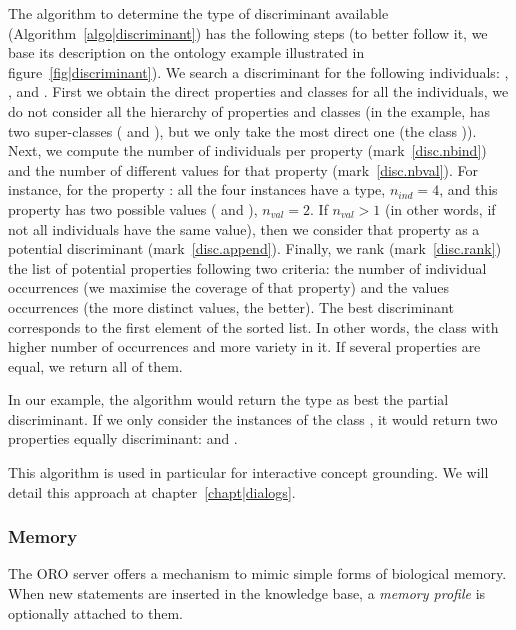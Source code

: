 The algorithm to determine the type of discriminant available
(Algorithm~\ref{algo|discriminant}) has the following steps (to better follow
it, we base its description on the ontology example illustrated in
figure~\ref{fig|discriminant}). We search a discriminant for the following
individuals: , ,  and
. First we obtain the direct properties and classes for all
the individuals, \ie we do not consider all the hierarchy of properties and
classes (in the example,  has two super-classes
( and ), but we only take the most direct one
(the class )). Next, we compute the number of individuals per
property (mark~\ref{disc.nbind}) and the number of different values for that
property (mark~\ref{disc.nbval}). For instance, for the property
: all the four instances have a type, $n_{ind} = 4$, and this
property has two possible values ( and ),
$n_{val} = 2$. If $n_{val} > 1$ (in other words, if not all individuals have
the same value), then we consider that property as a potential discriminant
(mark~\ref{disc.append}).  Finally, we rank (mark~\ref{disc.rank}) the list of
potential properties following two criteria: the number of individual
occurrences (\ie we maximise the coverage of that property) and the values
occurrences (\ie the more distinct values, the better).  The best discriminant
corresponds to the first element of the sorted list. In other words, the class
with higher number of occurrences and more variety in it.  If several
properties are equal, we return all of them.

In our example, the algorithm would return the type as best the partial
discriminant. If we only consider the instances of the class ,
it would return two properties equally discriminant:  and
.

This algorithm is used in particular for interactive concept grounding. We will
detail this approach at chapter~\ref{chapt|dialogs}.

\subsubsection{Memory}
\label{sect|oroserver-memory}

The ORO server offers a mechanism to mimic simple forms of biological memory.
When new statements are inserted in the knowledge base, a \emph{memory profile}
is optionally attached to them.

